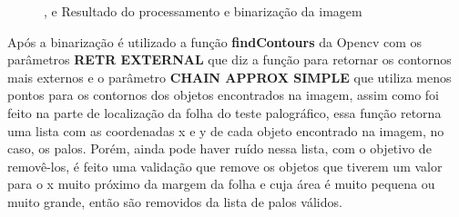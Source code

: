 \begin{figure}[h]
 \centering
   \qquad
     \qquad
   \caption{{} , {} e {} Resultado do processamento e binarização da imagem }
  \label{subfig:roi-seg}
\end{figure}

Após a binarização é utilizado a função \textbf{findContours} da Opencv com os parâmetros \textbf{RETR EXTERNAL}  que diz a função para retornar os contornos mais externos e o parâmetro \textbf{CHAIN APPROX SIMPLE} que utiliza menos pontos para os contornos dos objetos encontrados na imagem, assim como foi feito na parte de localização da folha do teste palográfico, essa função retorna uma lista com as coordenadas x e y de cada objeto encontrado na imagem, no caso, os palos. Porém, ainda pode haver ruído nessa lista, com o objetivo de removê-los, é feito uma validação que remove os objetos que tiverem um valor para o x muito próximo da margem da folha  e cuja área é muito pequena ou muito grande, então são removidos da lista de palos válidos.

